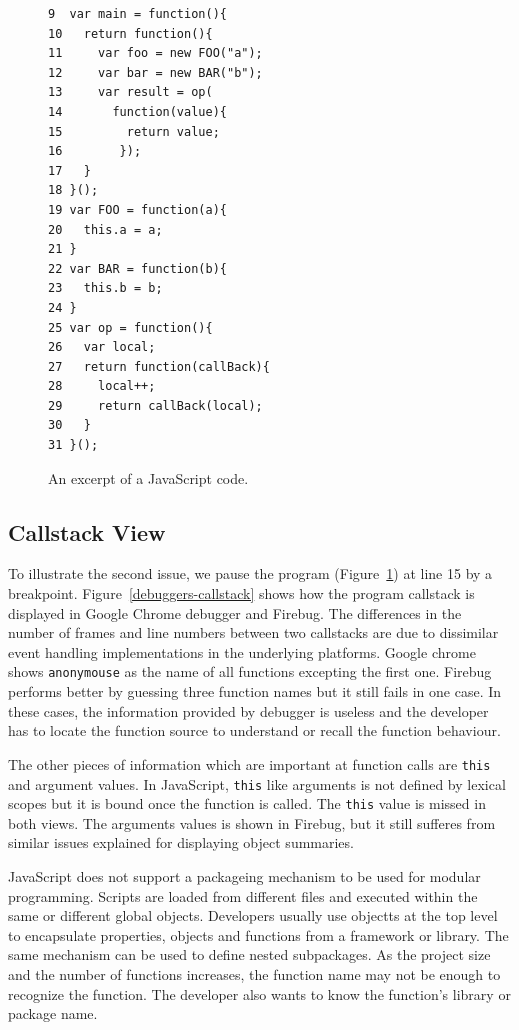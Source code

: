 \documentclass{acm_proc_article-sp}
\begin{document}
\begin{figure}[htp]
{\small 
\begin{verbatim}
9  var main = function(){
10   return function(){
11     var foo = new FOO("a");
12     var bar = new BAR("b");
13     var result = op(
14       function(value){
15         return value;
16        });
17   }
18 }();
19 var FOO = function(a){
20   this.a = a;
21 }
22 var BAR = function(b){
23   this.b = b;
24 }
25 var op = function(){
26   var local;
27   return function(callBack){
28     local++;
29     return callBack(local);
30   }
31 }();
\end{verbatim}}
\caption{An excerpt of a JavaScript code.}
\label{js-code}
\end{figure}

\subsection{Callstack View}
To illustrate the second issue, we pause the program (Figure~\ref{js-code}) at line 15 by a breakpoint. Figure~\ref{debuggers-callstack} shows how the program callstack is displayed in Google Chrome debugger and Firebug. The differences in the number of frames and line numbers between two callstacks are due to dissimilar event handling implementations in the underlying platforms. Google chrome shows {\small\texttt{anonymouse}} as the name of all functions excepting the first one. Firebug performs better by guessing three function names but it still fails in one case. In these cases, the information provided by debugger is useless and the developer has to locate the function source to understand or recall the function behaviour. 

The other pieces of information which are important at function calls are {\small\texttt{this}} and argument values. In JavaScript, {\small\texttt{this}} like arguments is not defined by lexical scopes but it is bound once the function is called. The {\small\texttt{this}} value is missed in both views. The arguments values is shown in Firebug, but it still sufferes from similar issues explained for displaying object summaries.

JavaScript does not support a packageing mechanism to be used for modular programming. Scripts are loaded from different files and executed within the same or different global objects. Developers usually use objectts at the top level to encapsulate properties, objects and functions from a framework or library. The same mechanism can be used to define nested subpackages. As the project size and the number of functions increases, the function name may not be enough to recognize the function. The developer also wants to know the function's library or package name. 
\end{document}
